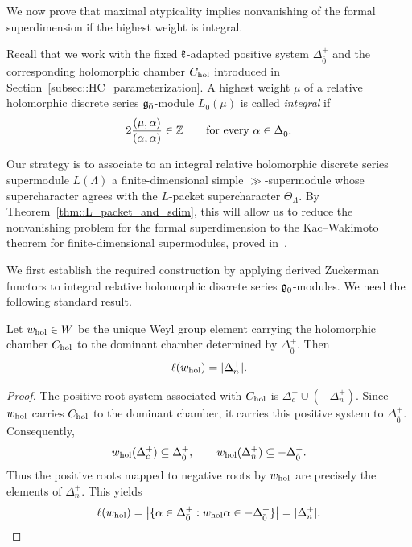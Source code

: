We now prove that maximal atypicality implies nonvanishing of the formal superdimension if the highest weight is integral.

Recall that we work with the fixed ${\mathfrak k}$-adapted positive system $\Delta_{\bar0}^+$ and the corresponding holomorphic chamber $C_{\operatorname{hol}}$ introduced in Section~\ref{subsec::HC_parameterization}. A highest weight $\mu$ of a relative holomorphic discrete series ${\mathfrak{g}_{\bar{0}}}$-module $L_0(\mu)$ is called \emph{integral} if
\begin{equation}
2\frac{(\mu,\alpha)}{(\alpha,\alpha)}\in{\mathbb Z}
\qquad
\text{for every }\alpha\in\Delta_{\bar0}.
\end{equation}

Our strategy is to associate to an integral relative holomorphic discrete series supermodule $L(\Lambda)$ a finite-dimensional simple $\gg$-supermodule whose supercharacter agrees with the $L$-packet supercharacter $\Theta_\Lambda$. By Theorem~\ref{thm::L_packet_and_sdim}, this will allow us to reduce the nonvanishing problem for the formal superdimension to the Kac--Wakimoto theorem for finite-dimensional supermodules, proved in~\cite{serganova2011superdimension}.

We first establish the required construction by applying derived Zuckerman functors to integral relative holomorphic discrete series ${\mathfrak{g}_{\bar{0}}}$-modules. We need the following standard result.

\begin{lemma}\label{lemm::length_holomorphic_Weyl_element}
 Let $w_{\operatorname{hol}}\in W$
be the unique Weyl group element carrying the
holomorphic chamber $C_{\operatorname{hol}}$ to the dominant
chamber determined by $\Delta_{\bar0}^+$. Then
\[
\ell(w_{\operatorname{hol}})=|\Delta_{n}^{+}|.
\]
\end{lemma}

\begin{proof}
The positive root system associated with
$C_{\operatorname{hol}}$ is
$
\Delta_c^+\cup(-\Delta_n^+).
$
Since $w_{\operatorname{hol}}$ carries $C_{\operatorname{hol}}$ to the
dominant chamber, it carries this positive
system to $\Delta_{\bar0}^+$. Consequently,
\[
w_{\operatorname{hol}}(\Delta_c^+)\subseteq\Delta_{\bar0}^+,
\qquad
w_{\operatorname{hol}}(\Delta_n^+)\subseteq-\Delta_{\bar0}^+.
\]
Thus the positive roots mapped to negative roots
by $w_{\operatorname{hol}}$ are precisely the elements of
$\Delta_n^+$. This yields
\[
\ell(w_{\operatorname{hol}})
=
\bigl|\{\alpha\in\Delta_{\bar0}^+:
w_{\operatorname{hol}}\alpha\in-\Delta_{\bar0}^+\}\bigr|
=
|\Delta_n^+|.\qedhere
\]
\end{proof}

